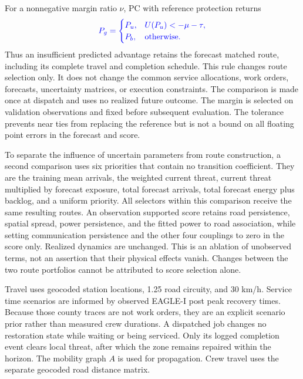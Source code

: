 \documentclass[journal]{IEEEtran}
\providecommand{\DIFadd}[1]{{\protect\color{blue}\uwave{#1}}} %
\providecommand{\DIFaddbegin}{} %
\providecommand{\DIFaddend}{} %
\newcommand{\DIFaddincludegraphics}[2][]{{\color{blue}\fbox{\DIFOincludegraphics[#1]{#2}}}} %
\DeclareRobustCommand{\DIFaddbegin}{\DIFOaddbegin \let\includegraphics\DIFaddincludegraphics} %
\DeclareRobustCommand{\DIFaddend}{\DIFOaddend \let\includegraphics\DIFOincludegraphics} %
\renewcommand{\DIFaddbegin}{}
\renewcommand{\DIFaddend}{}
\renewcommand{\DIFadd}[1]{{\color{blue}#1}}
\renewcommand{\DIFaddincludegraphics}[2][]{{\setlength{\fboxsep}{-\fboxrule}\color{blue}\fbox{\DIFOincludegraphics[#1]{#2}}}}
\begin{document}
\DIFadd{For a nonnegative margin ratio $\nu$, PC with reference protection returns
}\begin{equation}
\DIFadd{P_g=\begin{cases}
P_u,&U(P_u)<-\mu-\tau,\\
P_b,&\text{otherwise}.
\end{cases}
\label{eq:protected-route}
}\end{equation}
\DIFadd{Thus an insufficient predicted advantage retains the forecast matched route,
including its complete travel and completion schedule.  This rule changes
route selection only.  It does not change the common service allocations,
work orders, forecasts, uncertainty matrices, or execution constraints.
The comparison is made once at dispatch and uses no realized future outcome.
The margin is selected on validation observations and fixed before subsequent
evaluation.  The tolerance prevents near ties from replacing the reference
but is not a bound on all floating point errors in the forecast and score.
}\DIFaddend 

\DIFaddbegin \DIFadd{To separate the influence of uncertain parameters from route construction,
a second comparison uses six priorities that contain no transition
coefficient.  They are the training mean arrivals, the weighted current
threat, current threat multiplied by forecast exposure, total forecast
arrivals, total forecast energy plus backlog, and a uniform priority.
All selectors within this comparison receive the same resulting routes.
An observation supported score retains road persistence, spatial spread,
power persistence, and the fitted power to road association, while setting
communication persistence and the other four couplings to zero in the
score only.  Realized dynamics are unchanged.  This is an ablation of
unobserved terms, not an assertion that their physical effects vanish.
Changes between the two route portfolios cannot be attributed to score
selection alone.
}


\DIFadd{Travel uses geocoded station
locations, 1.25 road circuity, and 30 km/h.
Service time scenarios are informed by observed EAGLE-I post peak recovery
times.  Because those county traces are not work orders, they are an explicit
scenario prior rather than measured crew durations.  A dispatched job changes
no restoration state while waiting or being serviced.  Only its logged
completion event clears local threat, after which the zone remains repaired
within the horizon.  The mobility graph $A$ is used for propagation.  Crew
travel uses the separate geocoded road distance matrix.
}
\end{document}
